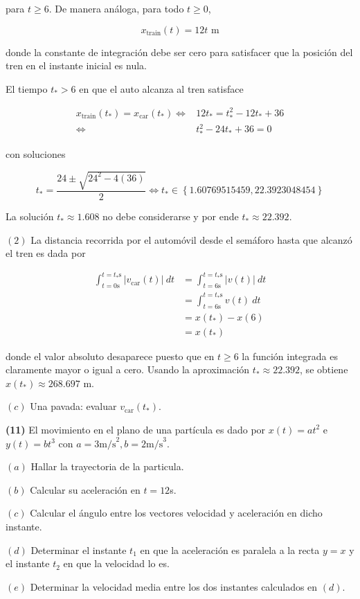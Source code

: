 \documentclass[12pt]{article}
\theoremstyle{definition}
\begin{document}
para $t \geq 6$. De manera análoga, para todo $t \geq 0$,

\begin{equation*}
    x_{\text{train}}(t) = 12t  \text{ m}
\end{equation*}

donde la constante de integración debe ser cero para satisfacer que la posición
del tren en el instante inicial es nula.

El tiempo $t_* > 6$ en que el auto alcanza al tren satisface 

\begin{align*}
x_{\text{train}}(t_*)
= x_{\text{car}}(t_*) 
\iff 
&12t_* = t_*^2 -12 t_* + 36\\ 
\iff
&t_*^2 -24t_* + 36 = 0
\end{align*}

con soluciones 

\begin{equation*}
    t_* = \frac{24 \pm \sqrt{24^2 -4 (36)} }{2} \iff t_* \in \left\{
    1.60769515459, 22.3923048454 \right\} 
\end{equation*}

La solución $t_* \approx 1.608$ no debe considerarse y por ende $t_* \approx
22.392$.

$(2)$ La distancia recorrida por el automóvil desde el semáforo hasta que
alcanzó el tren es dada por 

\begin{align*}
    \int_{t=0\text{s}}^{t=t_*\text{s}} \left| v_{\text{car}}(t) \right| ~ dt 
    &= \int_{t=6\text{s}}^{t={t_* \text{s}}} \left| v(t) \right| ~dt \\
    &= \int_{t=6\text{s}}^{t={t_* \text{s}}}  v(t) ~dt \\ 
    &=x(t_*) - x(6)\\ 
    &=x(t_*)
\end{align*}

donde el valor absoluto desaparece puesto que en $t \geq 6$ la función integrada
es claramente mayor o igual a cero. Usando la aproximación $t_* \approx 22.392$,
se obtiene $x(t_*) \approx 268.697 \text{ m}$.

$(c)$ Una pavada: evaluar $v_{\text{car}}(t_*)$.

\pagebreak 

\begin{shaded}
    \textbf{(11)} El movimiento en el plano de una partícula es dado por 
    $x(t) = at^2$ e $y(t) = bt^3$ con $a = 3 \text{m/s}^2, b = 2\text{m/s}^3$.

    $(a)$ Hallar la trayectoria de la particula. 

    $(b)$ Calcular su aceleración en $t = 12$s. 

    $(c)$ Calcular el ángulo entre los vectores velocidad y aceleración en dicho
    instante. 

    $(d)$ Determinar el instante $t_1$ en que la aceleración es paralela a la
    recta $y = x$ y el instante $t_2$ en que la velocidad lo es. 

    $(e)$ Determinar la velocidad media entre los dos instantes calculados en
    $(d)$.
\end{shaded}
\end{document}
